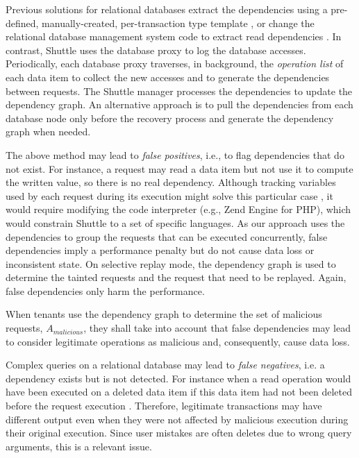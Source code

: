 Previous solutions for relational databases extract the dependencies using a pre-defined, manually-created, per-transaction type template \cite{itdb}, or change the relational database management system code to extract read dependencies \cite{phoenix}. In contrast, Shuttle uses the database proxy to log the database accesses. Periodically, each database proxy traverses, in background, the \emph{operation list} of each data item to collect the new accesses and to generate the dependencies between requests. The Shuttle manager processes the dependencies to update the dependency graph. An alternative approach is to pull the dependencies from each database node only before the recovery process and generate the dependency graph when needed. 






The above method may lead to \emph{false positives}, i.e., to flag dependencies that do not exist. For instance, a request may read a data item but not use it to compute the written value, so there is no real dependency. Although tracking variables used by each request during its execution might solve this particular case \cite{Akkus2010}, it would require modifying the code interpreter (e.g., Zend Engine for PHP), which would constrain Shuttle to a set of specific languages. As our approach uses the dependencies to group the requests that can be executed concurrently, false dependencies imply a performance penalty but do not cause data loss or inconsistent state. On selective replay mode, the dependency graph is used to determine the tainted requests and the request that need to be replayed. Again, false dependencies only harm the performance.

When tenants use the dependency graph to determine the set of malicious requests, $A_{malicious}$, they shall take into account that false dependencies may lead to consider legitimate operations as malicious and, consequently, cause data loss.

Complex queries on a relational database may lead to \emph{false negatives}, i.e. a dependency exists but is not detected. For instance when a read operation would have been executed on a deleted data item if this data item had not been deleted before the request execution \cite{Xie2008}. Therefore, legitimate transactions may have different output even when they were not affected by malicious execution during their original execution. Since user mistakes are often deletes due to wrong query arguments, this is a relevant issue. 

